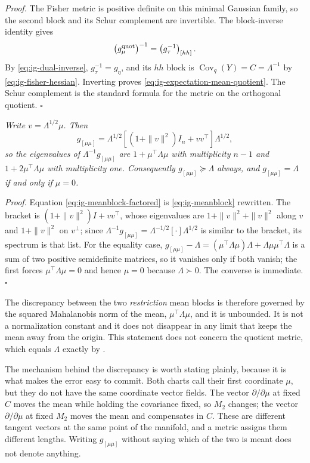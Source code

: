 \noindent\emph{Proof.} The Fisher metric is positive definite on this minimal
Gaussian family, so the second block and its Schur complement are invertible.
The block-inverse identity gives
\[
\left(g_{\mu}^{\rm quot}\right)^{-1}
=\left(g_\tau^{-1}\right)_{[hh]}.
\]
By \eqref{eq:ig-dual-inverse}, $g_\tau^{-1}=g_\eta$, and its $hh$ block is
$\operatorname{Cov}_q(Y)=C=\Lambda^{-1}$ by
\eqref{eq:ig-fisher-hessian}. Inverting proves
\eqref{eq:ig-expectation-mean-quotient}. The Schur complement is the standard
formula for the metric on the orthogonal quotient. \hfill$\square$

\medskip
{}
\emph{Write $v=\Lambda^{1/2}\mu$. Then}
\begin{equation}
g_{[\mu\mu]}=\Lambda^{1/2}\left[\left(1+\|v\|^2\right)I_{n}+vv^\top\right]\Lambda^{1/2},
\label{eq:ig-meanblock-factored}
\end{equation}
\emph{so the eigenvalues of $\Lambda^{-1}g_{[\mu\mu]}$ are $1+\mu^\top\Lambda\mu$ with multiplicity $n-1$ and $1+2\mu^\top\Lambda\mu$ with multiplicity one. Consequently $g_{[\mu\mu]}\succeq\Lambda$ always, and $g_{[\mu\mu]}=\Lambda$ if and only if $\mu=0$.}

\noindent\emph{Proof.} Equation \eqref{eq:ig-meanblock-factored} is \eqref{eq:ig-meanblock} rewritten. The bracket is $\left(1+\|v\|^2\right)I+vv^\top$, whose eigenvalues are $1+\|v\|^2+\|v\|^2$ along $v$ and $1+\|v\|^2$ on $v^\perp$; since $\Lambda^{-1}g_{[\mu\mu]}=\Lambda^{-1/2}\left[\cdot\right]\Lambda^{1/2}$ is similar to the bracket, its spectrum is that list. For the equality case, $g_{[\mu\mu]}-\Lambda=\left(\mu^\top\Lambda\mu\right)\Lambda+\Lambda\mu\mu^\top\Lambda$ is a sum of two positive semidefinite matrices, so it vanishes only if both vanish; the first forces $\mu^\top\Lambda\mu=0$ and hence $\mu=0$ because $\Lambda\succ0$. The converse is immediate. \hfill$\square$

\medskip
The discrepancy between the two \emph{restriction} mean blocks is therefore governed by the squared Mahalanobis norm of the mean, $\mu^\top\Lambda\mu$, and it is unbounded. It is not a normalization constant and it does not disappear in any limit that keeps the mean away from the origin. This statement does not concern the quotient metric, which equals $\Lambda$ exactly by .

The mechanism behind the discrepancy is worth stating plainly, because it is what makes the error easy to commit. Both charts call their first coordinate $\mu$, but they do not have the same coordinate vector fields. The vector $\partial/\partial\mu$ at fixed $C$ moves the mean while holding the covariance fixed, so \(M_2\) changes; the vector $\partial/\partial\mu$ at fixed $M_2$ moves the mean and compensates in $C$. These are different tangent vectors at the same point of the manifold, and a metric assigns them different lengths. Writing $g_{[\mu\mu]}$ without saying which of the two is meant does not denote anything.

